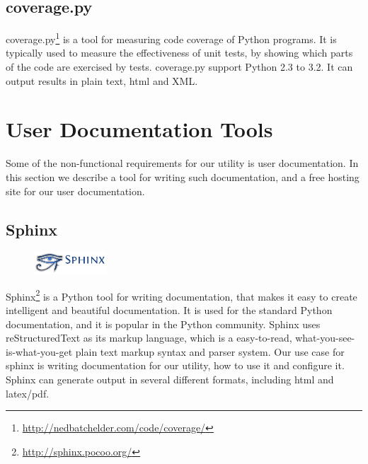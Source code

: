 \subsection{coverage.py}
coverage.py\footnote{\url{http://nedbatchelder.com/code/coverage/}} is a tool
for measuring code coverage of Python programs. It is typically used to measure
the effectiveness of unit tests, by showing which parts of the code are
exercised by tests. coverage.py support Python 2.3 to 3.2. It can output
results in plain text, html and XML.


\section{User Documentation Tools}
\label{sec:pre:docs}
Some of the non-functional requirements for our utility is user documentation.
In this section we describe a tool for writing such documentation, and a free
hosting site for our user documentation.

\subsection{Sphinx}
\begin{figure}
	\vspace{-20pt}
	\includegraphics[width=2.7cm]{./planning/img/sphinx_logo}
	\vspace{-20pt}
\end{figure}
Sphinx\footnote{\url{http://sphinx.pocoo.org/}} is a Python tool for writing
documentation, that makes it easy to create intelligent and beautiful
documentation. It is used for the standard Python documentation, and it is
popular in the Python community. Sphinx uses reStructuredText as its markup
language, which is a easy-to-read, what-you-see-is-what-you-get plain text
markup syntax and parser system. Our use case for sphinx is writing
documentation for our utility, how to use it and configure it. Sphinx can
generate output in several different formats, including html and latex/pdf.

